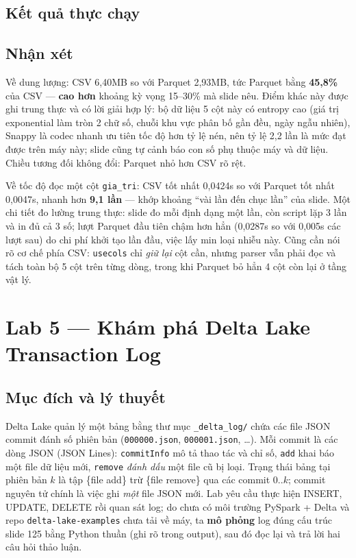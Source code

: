 \documentclass[12pt,a4paper,oneside]{article}
\begin{document}
\subsection{Kết quả thực chạy}



\subsection{Nhận xét}

Về dung lượng: CSV 6,40MB so với Parquet 2,93MB, tức Parquet bằng \textbf{45,8\%} của CSV --- \textbf{cao hơn} khoảng kỳ vọng 15--30\% mà slide nêu. Điểm khác này được ghi trung thực và có lời giải hợp lý: bộ dữ liệu 5 cột này có entropy cao (giá trị exponential làm tròn 2 chữ số, chuỗi khu vực phân bố gần đều, ngày ngẫu nhiên), Snappy là codec nhanh ưu tiên tốc độ hơn tỷ lệ nén, nên tỷ lệ 2,2 lần là mức đạt được trên máy này; slide cũng tự cảnh báo con số phụ thuộc máy và dữ liệu. Chiều tương đối không đổi: Parquet nhỏ hơn CSV rõ rệt.

Về tốc độ đọc một cột \texttt{gia\_tri}: CSV tốt nhất 0,0424s so với Parquet tốt nhất 0,0047s, nhanh hơn \textbf{9,1 lần} --- khớp khoảng ``vài lần đến chục lần'' của slide. Một chi tiết đo lường trung thực: slide đo mỗi định dạng một lần, còn script lặp 3 lần và in đủ cả 3 số; lượt Parquet đầu tiên chậm hơn hẳn (0,0287s so với 0,005s các lượt sau) do chi phí khởi tạo lần đầu, việc lấy min loại nhiễu này. Cũng cần nói rõ cơ chế phía CSV: \texttt{usecols} chỉ \emph{giữ lại} cột cần, nhưng parser vẫn phải đọc và tách toàn bộ 5 cột trên từng dòng, trong khi Parquet bỏ hẳn 4 cột còn lại ở tầng vật lý.

\section{Lab 5 --- Khám phá Delta Lake Transaction Log}
\label{sec:lab5}

\subsection{Mục đích và lý thuyết}

Delta Lake quản lý một bảng bằng thư mục \texttt{\_delta\_log/} chứa các file JSON commit đánh số phiên bản (\texttt{000000.json}, \texttt{000001.json}, \ldots). Mỗi commit là các dòng JSON (JSON Lines): \texttt{commitInfo} mô tả thao tác và chỉ số, \texttt{add} khai báo một file dữ liệu mới, \texttt{remove} \emph{đánh dấu} một file cũ bị loại. Trạng thái bảng tại phiên bản $k$ là tập \{file add\} trừ \{file remove\} qua các commit $0..k$; commit nguyên tử chính là việc ghi \emph{một} file JSON mới. Lab yêu cầu thực hiện INSERT, UPDATE, DELETE rồi quan sát log; do chưa có môi trường PySpark + Delta và repo \texttt{delta-lake-examples} chưa tải về máy, ta \textbf{mô phỏng} log đúng cấu trúc slide 125 bằng Python thuần (ghi rõ trong output), sau đó đọc lại và trả lời hai câu hỏi thảo luận.
\end{document}
